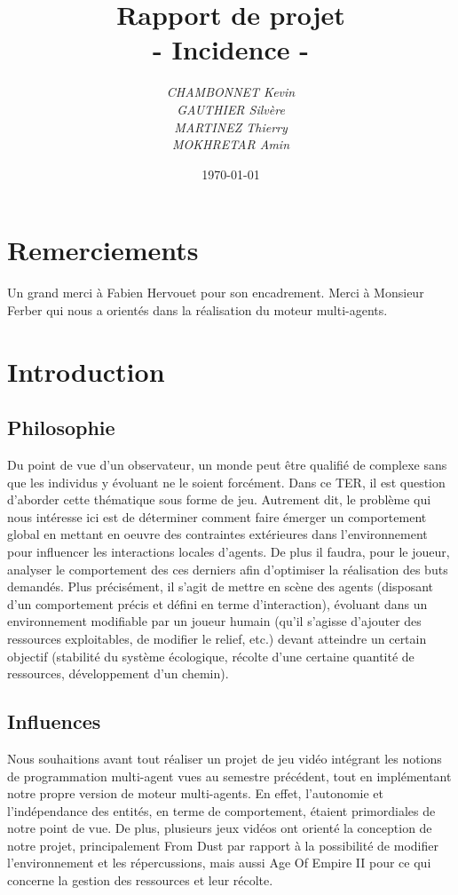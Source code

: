 \documentclass[a4paper]{memoir}
\title{\textbf{Rapport de projet}\\- \Huge{Incidence} -}
\author{\emph{CHAMBONNET Kevin}\\\emph{GAUTHIER Silvère}\\\emph{MARTINEZ Thierry}\\\emph{MOKHRETAR Amin}}
\date{\today}
\begin{document}
	\maketitle
	\newpage
	\tableofcontents

	\chapter{Remerciements}

		Un grand merci à Fabien Hervouet pour son encadrement.
		Merci à Monsieur Ferber qui nous a orientés dans la réalisation du moteur multi-agents.

	\chapter{Introduction}
	
		\section{Philosophie}
			Du point de vue d’un observateur, un monde peut être qualifié de complexe sans que les individus y évoluant ne le soient forcément. Dans ce TER, il est question d’aborder cette thématique sous forme de jeu. Autrement dit, le problème qui nous intéresse ici est de déterminer comment faire émerger un comportement global en mettant en oeuvre des contraintes extérieures dans l’environnement pour influencer les interactions locales d’agents. De plus il faudra, pour le joueur, analyser le comportement des ces derniers afin d’optimiser la réalisation des buts demandés. Plus précisément, il s’agit de mettre en scène des agents (disposant d’un comportement précis et défini en terme d’interaction), évoluant dans un environnement modifiable par un joueur humain (qu’il s’agisse d’ajouter des ressources exploitables, de modifier le relief, etc.) devant atteindre un certain objectif (stabilité du système écologique, récolte d’une certaine quantité de ressources, développement d’un chemin).
		
		\section{Influences}
			Nous souhaitions avant tout réaliser un projet de jeu vidéo intégrant les notions de programmation multi-agent vues au semestre précédent, tout en implémentant notre propre version de moteur multi-agents. En effet, l'autonomie et l'indépendance des entités, en terme de comportement, étaient primordiales de notre point de vue. De plus, plusieurs jeux vidéos ont orienté la conception de notre projet, principalement From Dust par rapport à la possibilité de modifier l'environnement et les répercussions, mais aussi Age Of Empire II pour ce qui concerne la gestion des ressources et leur récolte. 
		
\end{document}
